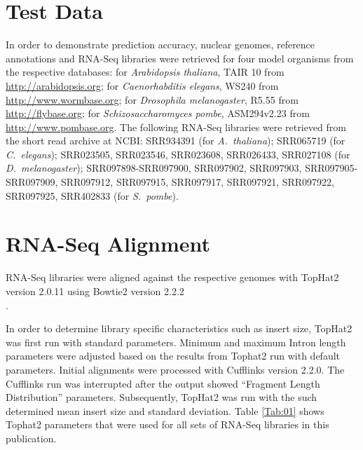 \documentclass[a4paper,10pt]{report}
\begin{document}
\section{Test Data}

In order to demonstrate prediction accuracy, nuclear genomes, reference annotations and RNA-Seq libraries were retrieved for four model organisms from the respective databases: for \textit{Arabidopsis thaliana}, TAIR 10 from \url{http://arabidopsis.org}; for \textit{Caenorhabditis elegans}, WS240 from \url{http://www.wormbase.org}; for \textit{Drosophila melanogaster}, R5.55 from \url{http://flybase.org}; for \textit{Schizosaccharomyces pombe}, ASM294v2.23 from \url{http://www.pombase.org}. The following RNA-Seq libraries were retrieved from the short read archive at NCBI: SRR934391 (for \textit{A.~thaliana}); SRR065719 (for \textit{C.~elegans}); SRR023505, SRR023546, SRR023608, SRR026433, SRR027108 (for \textit{D.~melanogaster}); SRR097898-SRR097900, SRR097902, SRR097903,
SRR097905-SRR097909, SRR097912, SRR097915, SRR097917, SRR097921, SRR097922, SRR097925, SRR402833 (for \textit{S.~pombe}).

\section{RNA-Seq Alignment}

RNA-Seq libraries were aligned against the respective genomes with TopHat2 version 2.0.11 \cite{TopHat2} using Bowtie2 version 2.2.2\\ \cite{Bowtie2}.

In order to determine library specific characteristics such as insert size, TopHat2 was first run with standard parameters. Minimum and maximum Intron length parameters were adjusted based on the results from Tophat2 run with default parameters. Initial alignments were processed with Cufflinks \cite{Cufflinks} version 2.2.0. The Cufflinks run was interrupted after the output showed ``Fragment Length Distribution'' parameters. Subsequently, TopHat2 was run with the such determined mean insert size and standard deviation.  Table \ref{Tab:01} shows Tophat2 parameters that were used for all sets of RNA-Seq libraries in this publication.
\end{document}
